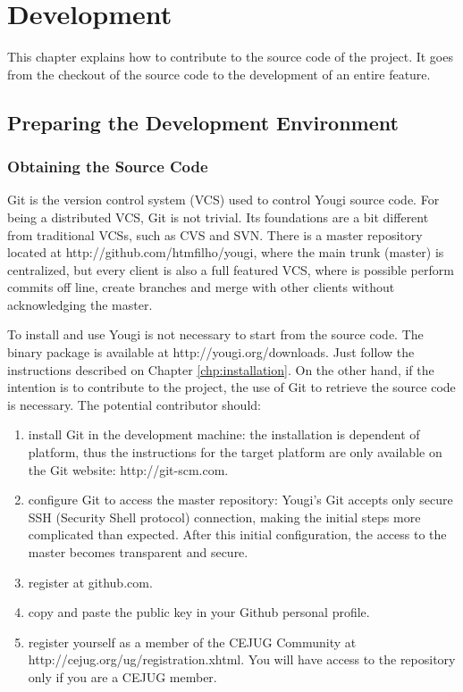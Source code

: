 \documentclass[envcountsame,envcountchap,letterpaper]{svmono}
\begin{document}
\chapter{Development}

This chapter explains how to contribute to the source code of the project. It goes from the checkout of the source code to the development of an entire feature.

\section{Preparing the Development Environment}

\subsection{Obtaining the Source Code}
\label{ssec:obtaining-source-code}

Git is the version control system (VCS) used to control Yougi source code. For being a distributed VCS, Git is not trivial. Its foundations are a bit different from traditional VCSs, such as CVS and SVN. There is a master repository located at http://github.com/htmfilho/yougi, where the main trunk (master) is centralized, but every client is also a full featured VCS, where is possible perform commits off line, create branches and merge with other clients without acknowledging the master.

To install and use Yougi is not necessary to start from the source code. The binary package is available at http://yougi.org/downloads. Just follow the instructions described on Chapter \ref{chp:installation}. On the other hand, if the intention is to contribute to the project, the use of Git to retrieve the source code is necessary. The potential contributor should:

\begin{enumerate}
\item install Git in the development machine: the installation is dependent of platform, thus the instructions for the target platform are only available on the Git website: http://git-scm.com.
\item configure Git to access the master repository: Yougi's Git accepts only secure SSH (Security Shell protocol) connection, making the initial steps more complicated than expected. After this initial configuration, the access to the master becomes transparent and secure.
\item register at github.com.
\item copy and paste the public key in your Github personal profile.
\item register yourself as a member of the CEJUG Community at \\ http://cejug.org/ug/registration.xhtml. You will have access to the repository only if you are a CEJUG member.
\end{enumerate}
\end{document}
